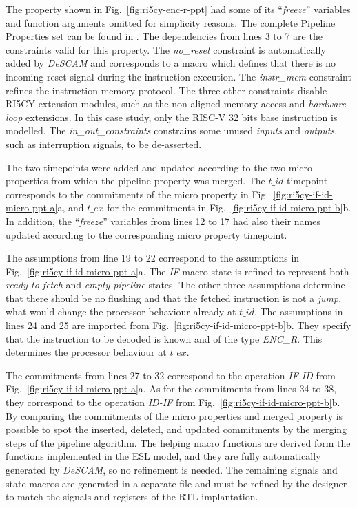 The property shown in Fig.~\ref{fig:ri5cy-enc-r-ppt} had some of its “\textit{freeze}” variables and function arguments omitted for simplicity reasons. The complete Pipeline Properties set can be found in \cite{descam}. The dependencies from lines 3 to 7 are the constraints valid for this property. The \textit{no\_reset} constraint is automatically added by \textit{DeSCAM} and corresponds to a macro which defines that there is no incoming reset signal during the instruction execution. The \textit{instr\_mem} constraint refines the instruction memory protocol. The three other constraints disable RI5CY extension modules, such as the non-aligned memory access and \textit{hardware loop} extensions. In this case study, only the RISC-V 32 bits base instruction is modelled. The \textit{in\_out\_constraints} constrains some unused \textit{inputs} and \textit{outputs}, such as interruption signals, to be de-asserted. 

The two timepoints were added and updated according to the two micro properties from which the pipeline property was merged. The $t\_id$ timepoint corresponds to the commitments of the micro property in Fig.~\ref{fig:ri5cy-if-id-micro-ppt-a}a, and $t\_ex$ for the commitments in Fig.~\ref{fig:ri5cy-if-id-micro-ppt-b}b. In addition, the “\textit{freeze}” variables from lines 12 to 17 had also their names updated according to the corresponding micro property timepoint.

The assumptions from line 19 to 22 correspond to the assumptions in Fig.~\ref{fig:ri5cy-if-id-micro-ppt-a}a. The \textit{IF} macro state is refined to represent both \textit{ready to fetch} and \textit{empty pipeline} states. The other three assumptions determine that there should be no flushing and that the fetched instruction is not a \textit{jump}, what would change the processor behaviour already at $t\_id$. The assumptions in lines 24 and 25 are imported from Fig.~\ref{fig:ri5cy-if-id-micro-ppt-b}b. They specify that the instruction to be decoded is known and of the type \textit{ENC\_R}. This determines the processor behaviour at $t\_ex$.

The commitments from lines 27 to 32 correspond to the operation \textit{IF-ID} from Fig.~\ref{fig:ri5cy-if-id-micro-ppt-a}a. As for the commitments from lines 34 to 38, they correspond to the operation \textit{ID-IF} from Fig.~\ref{fig:ri5cy-if-id-micro-ppt-b}b. By comparing the commitments of the micro properties and merged property is possible to spot the inserted, deleted, and updated commitments by the merging steps of the pipeline algorithm. The helping macro functions are derived form the functions implemented in the ESL model, and they are fully automatically generated by \textit{DeSCAM}, so no refinement is needed. The remaining signals and state macros are generated in a separate file and must be refined by the designer to match the signals and registers of the RTL implantation. 


